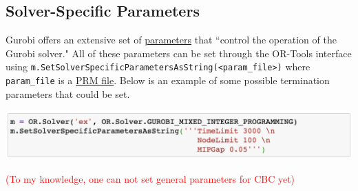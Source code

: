\documentclass[11 pt]{article}
\newcommand{\code}[1]{\colorbox{gray!10}{\textcolor{black!85}{\texttt{#1}}}}
\begin{document}
\subsection{Solver-Specific Parameters}

Gurobi offers an extensive set of \href{https://www.gurobi.com/documentation/9.0/refman/parameters.html}{parameters} that ``control the operation of the Gurobi solver." All of these parameters can be set through the OR-Tools interface using \code{m.SetSolverSpecificParametersAsString(<param\_file>)} where \texttt{param\_file} is a \href{https://www.gurobi.com/documentation/9.0/refman/prm_format.html#format:PRM}{PRM file}. Below is an example of some possible termination parameters that could be set.

\begin{center}
\includegraphics[scale=0.7]{images/Gparams.png}
\end{center}

\textcolor{red}{(To my knowledge, one can not set general parameters for CBC yet)}
\end{document}

